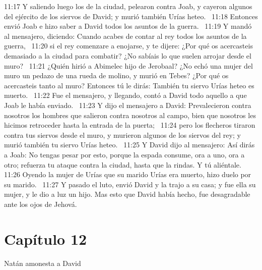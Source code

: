 11:17 Y saliendo luego los de la ciudad, pelearon contra Joab, y cayeron algunos del ejército de los siervos de David; y murió también Urías heteo.  
11:18 Entonces envió Joab e hizo saber a David todos los asuntos de la guerra.  
11:19 Y mandó al mensajero, diciendo: Cuando acabes de contar al rey todos los asuntos de la guerra,  
11:20 si el rey comenzare a enojarse, y te dijere: ¿Por qué os acercasteis demasiado a la ciudad para combatir? ¿No sabíais lo que suelen arrojar desde el muro?  
11:21 ¿Quién hirió a Abimelec hijo de Jerobaal? ¿No echó una mujer del muro un pedazo de una rueda de molino, y murió en Tebes? ¿Por qué os acercasteis tanto al muro? Entonces tú le dirás: También tu siervo Urías heteo es muerto.  
11:22 Fue el mensajero, y llegando, contó a David todo aquello a que Joab le había enviado.  
11:23 Y dijo el mensajero a David: Prevalecieron contra nosotros los hombres que salieron contra nosotros al campo, bien que nosotros les hicimos retroceder hasta la entrada de la puerta;  
11:24 pero los flecheros tiraron contra tus siervos desde el muro, y murieron algunos de los siervos del rey; y murió también tu siervo Urías heteo.  
11:25 Y David dijo al mensajero: Así dirás a Joab: No tengas pesar por esto, porque la espada consume, ora a uno, ora a otro; refuerza tu ataque contra la ciudad, hasta que la rindas. Y tú aliéntale.  
11:26 Oyendo la mujer de Urías que su marido Urías era muerto, hizo duelo por su marido.  
11:27 Y pasado el luto, envió David y la trajo a su casa; y fue ella su mujer, y le dio a luz un hijo. Mas esto que David había hecho, fue desagradable ante los ojos de Jehová.  
\section*{Capítulo 12 }
Natán amonesta a David  

